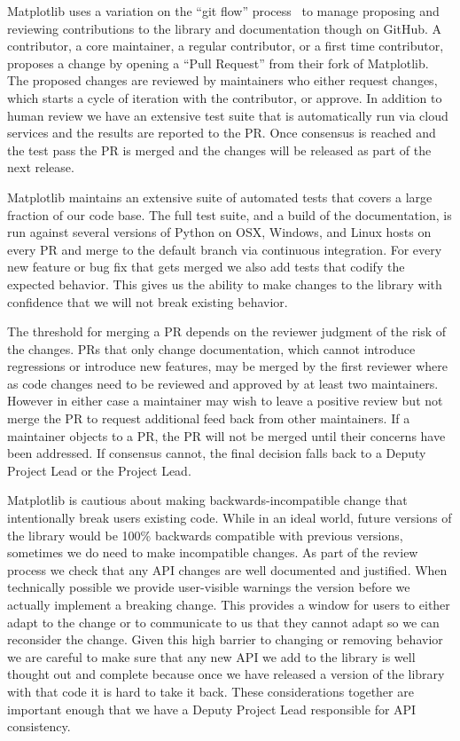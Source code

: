 \documentclass[12pt]{article}
\numberwithin{page}{section}
\begin{document}
Matplotlib uses a variation on the ``git flow'' process~\cite{ghflow}
to manage proposing and reviewing contributions to the library and
documentation though on GitHub.  A contributor, a core maintainer, a
regular contributor, or a first time contributor, proposes a change by
opening a ``Pull Request'' from their fork of Matplotlib.  The
proposed changes are reviewed by maintainers who either request
changes, which starts a cycle of iteration with the contributor, or
approve.  In addition to human review we have an extensive test suite
that is automatically run via cloud services and the results are
reported to the PR.  Once consensus is reached and the test pass the
PR is merged and the changes will be released as part of the next
release.

Matplotlib maintains an extensive suite of automated tests that covers
a large fraction of our code base.  The full test suite, and a build
of the documentation, is run against several versions of Python on
OSX, Windows, and Linux hosts on every PR and merge to the default
branch via continuous integration.  For every new feature or bug fix
that gets merged we also add tests that codify the expected behavior.
This gives us the ability to make changes to the library with
confidence that we will not break existing behavior.

The threshold for merging a PR depends on the reviewer judgment of the
risk of the changes.  PRs that only change documentation, which cannot
introduce regressions or introduce new features, may be merged by the
first reviewer where as code changes need to be reviewed and approved
by at least two maintainers.  However in either case a maintainer may
wish to leave a positive review but not merge the PR to request
additional feed back from other maintainers.  If a maintainer objects
to a PR, the PR will not be merged until their concerns have been
addressed.  If consensus cannot, the final decision falls back to a
Deputy Project Lead or the Project Lead.

Matplotlib is cautious about making backwards-incompatible change that
intentionally break users existing code.  While in an ideal world,
future versions of the library would be 100\% backwards compatible
with previous versions, sometimes we do need to make incompatible
changes.  As part of the review process we check that any API changes
are well documented and justified.  When technically possible we
provide user-visible warnings the version before we actually implement
a breaking change.  This provides a window for users to either adapt
to the change or to communicate to us that they cannot adapt so we
can reconsider the change.  Given this high barrier to changing or
removing behavior we are careful to make sure that any new API we add
to the library is well thought out and complete because once we have
released a version of the library with that code it is hard to take it
back.  These considerations together are important enough that we have
a Deputy Project Lead responsible for API consistency.
\end{document}
